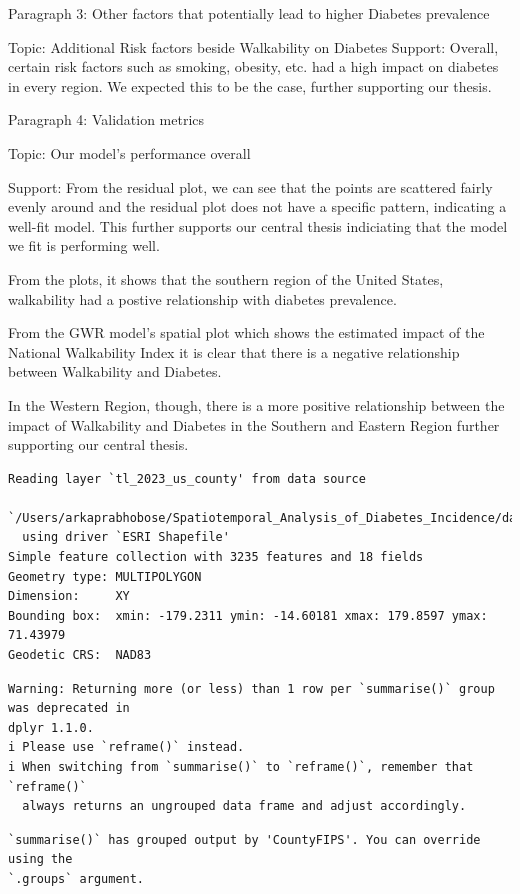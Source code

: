 \documentclass[
]{article}
\begin{document}
Paragraph 3: Other factors that potentially lead to higher Diabetes
prevalence

Topic: Additional Risk factors beside Walkability on Diabetes Support:
Overall, certain risk factors such as smoking, obesity, etc. had a high
impact on diabetes in every region. We expected this to be the case,
further supporting our thesis.

Paragraph 4: Validation metrics

Topic: Our model's performance overall

Support: From the residual plot, we can see that the points are
scattered fairly evenly around and the residual plot does not have a
specific pattern, indicating a well-fit model. This further supports our
central thesis indiciating that the model we fit is performing well.

From the plots, it shows that the southern region of the United States,
walkability had a postive relationship with diabetes prevalence.

From the GWR model's spatial plot which shows the estimated impact of
the National Walkability Index it is clear that there is a negative
relationship between Walkability and Diabetes.

In the Western Region, though, there is a more positive relationship
between the impact of Walkability and Diabetes in the Southern and
Eastern Region further supporting our central thesis.

\begin{verbatim}
Reading layer `tl_2023_us_county' from data source 
  `/Users/arkaprabhobose/Spatiotemporal_Analysis_of_Diabetes_Incidence/data/shapes/us_counties' 
  using driver `ESRI Shapefile'
Simple feature collection with 3235 features and 18 fields
Geometry type: MULTIPOLYGON
Dimension:     XY
Bounding box:  xmin: -179.2311 ymin: -14.60181 xmax: 179.8597 ymax: 71.43979
Geodetic CRS:  NAD83
\end{verbatim}

\begin{verbatim}
Warning: Returning more (or less) than 1 row per `summarise()` group was deprecated in
dplyr 1.1.0.
i Please use `reframe()` instead.
i When switching from `summarise()` to `reframe()`, remember that `reframe()`
  always returns an ungrouped data frame and adjust accordingly.
\end{verbatim}

\begin{verbatim}
`summarise()` has grouped output by 'CountyFIPS'. You can override using the
`.groups` argument.
\end{verbatim}
\end{document}
